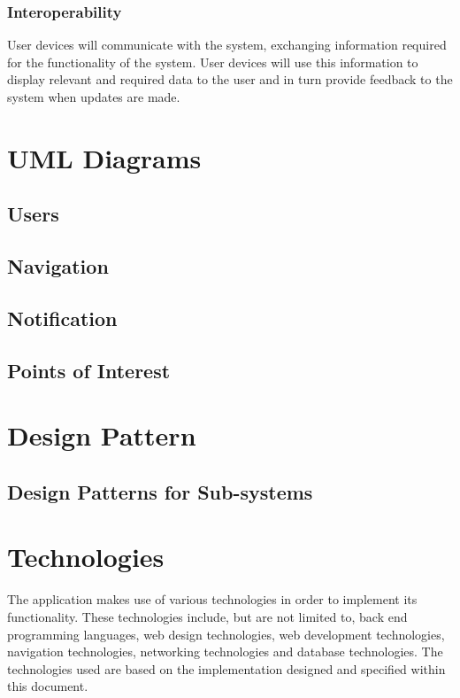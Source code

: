 \documentclass{article}
\begin{document}
		\subsubsection{Interoperability}
		User devices will communicate with the system, exchanging information required for the functionality of the system. User devices will use this information to display relevant and required data to the user and in turn provide feedback to the system when updates are made.

\section{UML Diagrams}
	\subsection{Users}
	
	\subsection{Navigation}
	
	\subsection{Notification}
	
	\subsection{Points of Interest}

\section{Design Pattern}
	\subsection{Design Patterns for Sub-systems}

\section{Technologies}
The application makes use of various technologies in order to implement its functionality. These technologies include, but are not limited to, back end programming languages, web design technologies, web development technologies, navigation technologies, networking technologies and database technologies.  The technologies used are based on the implementation designed and specified within this document.  
\end{document}

